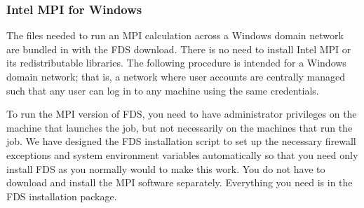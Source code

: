 \documentclass[11pt]{book}
\begin{document}
\subsubsection{Intel MPI for Windows}

The files needed to run an MPI calculation across a Windows domain network are bundled in with the FDS download. There is no need to install Intel MPI or its redistributable libraries. The following procedure is intended for a Windows domain network; that is, a network where user accounts are centrally managed such that any user can log in to any machine using the same credentials.

To run the MPI version of FDS, you need to have administrator privileges on the machine that launches the job, but not necessarily on the machines that run the job. We have designed the FDS installation script to set up the necessary firewall exceptions and system environment variables automatically so that you need only install FDS as you normally would to make this work. You do not have to download and install the MPI software separately. Everything you need is in the FDS installation package.
\end{document}
